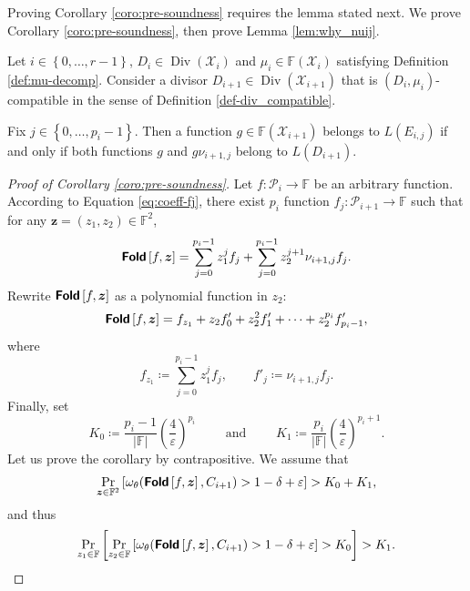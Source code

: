 \documentclass[a4paper,USenglish,autoref]{lipics-v2021}
\renewcommand\epsilon{\varepsilon}
\newcommand\F{\mathbb{F}}
\newcommand\fold[1]{\textsf{\textbf{Fold}}\left[#1\right]}
\DeclareMathOperator{\Div}{Div}
\renewcommand{\vec}[1]{\boldsymbol{#1}}
\newcommand{\set}[1]{\left\{#1\right\}}
\newcommand{\size}[1]{\left|#1\right|}
\newcommand{\range}[1]{\set{0,\dots,#1-1}}
\newcommand\bfz{{\vec{z}}}
\newcommand\calX{\mathcal{X}}
\newcommand\calP{\mathcal{P}}
\newcommand\mydef{\coloneqq}
\begin{document}
Proving Corollary \ref{coro:pre-soundness} requires the lemma stated next. We prove Corollary \ref{coro:pre-soundness}, then prove Lemma \ref{lem:why_nuij}.

\begin{lemma}\label{lem:why_nuij}
	Let $i \in \range{r}$, $D_i \in \Div(\calX_i)$ and $\mu_i \in \F(\calX_i)$ satisfying Definition \eqref{def:mu-decomp}. Consider a divisor $D_{i+1}\in\Div(\calX_{i+1})$ that is $(D_i,\mu_i)$-compatible in the sense of Definition \ref{def-div_compatible}.
	
	Fix $j \in \range{p_i}$. Then a function $g\in \F(\calX_{i+1})$ belongs to $L(E_{i,j})$ if and only if both functions $g$ and $g \nu_{i+1,j}$ belong to $L(D_{i+1})$.
\end{lemma}

\begin{proof}[Proof of Corollary \ref{coro:pre-soundness}]
	Let $f : \calP_i \rightarrow \F$ be an arbitrary function. According to Equation \eqref{eq:coeff-fj}, there exist $p_i$ function $f_j : \calP_{i+1} \rightarrow \F$ such that for any $\bfz=(z_1,z_2) \in \F^2$,
	\[\fold{f, \bfz} = \sum_{j = 0}^{p_i - 1}z_1^j f_j + \sum_{j = 0}^{p_i - 1}z_2^{j+1} \nu_{i+1,j} f_j.\]
	Rewrite $\fold{f, \bfz}$ as a polynomial function in $z_2$: \[\fold{f, \bfz}=f_{z_1} + z_2 f'_0+  z_2^2 f'_1 + \dots + z_2^{p_i} f'_{p_i-1},\] where \[f_{z_1} \mydef \sum_{j = 0}^{p_i - 1}z_1^j f_j, \qquad f'_j\mydef \nu_{i+1,j} f_j.\] Finally, set
	\[
	K_0 \mydef \frac{p_i - 1}{\size \F}\left(\frac{4}{\epsilon}\right)^{p_i} \qquad \text{ and } \qquad K_1 \mydef \frac{p_i}{\size \F}\left(\frac{4}{\epsilon}\right)^{p_i + 1} .
	\]    
	Let us prove the corollary by contrapositive. We assume that
	\[
	\Pr_{\bfz \in \F^2}\left[\omega_\theta(\fold{f, \bfz}, C_{i+1}) > 1 - \delta + \epsilon\right] > K_0 + K_1,
	\]
	and thus \[\Pr_{z_1 \in \F}\left[\Pr_{z_2 \in \F} \left[\omega_\theta(\fold{f, \bfz}, C_{i+1}) > 1 - \delta + \epsilon\right] > K_0\right] > K_1.\]
	

\end{proof}
\end{document}

